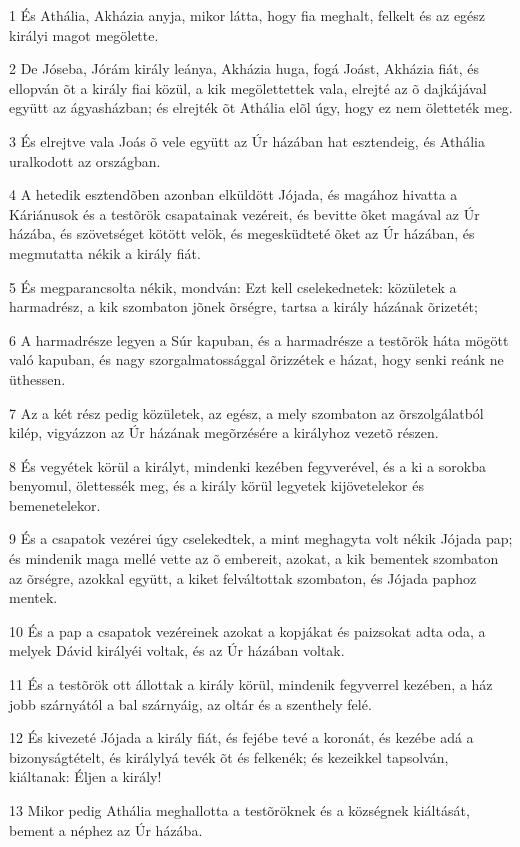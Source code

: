 \par 1 És Athália, Akházia anyja, mikor látta, hogy fia meghalt, felkelt  és az egész királyi magot megölette.
\par 2 De Jóseba, Jórám király leánya, Akházia huga, fogá Joást, Akházia fiát, és ellopván õt a király fiai közül, a kik megölettettek vala, elrejté az õ dajkájával együtt az ágyasházban; és elrejték õt Athália elõl úgy, hogy ez nem öletteték meg.
\par 3 És elrejtve vala Joás õ vele együtt az Úr házában hat esztendeig, és Athália uralkodott az országban.
\par 4 A hetedik esztendõben azonban elküldött Jójada, és magához hivatta a Káriánusok és a testõrök csapatainak vezéreit, és bevitte õket magával az Úr házába, és szövetséget kötött velök, és megesküdteté õket az Úr házában, és megmutatta nékik a király fiát.
\par 5 És megparancsolta nékik, mondván: Ezt kell cselekednetek: közületek a harmadrész, a kik szombaton jõnek õrségre, tartsa a király házának õrizetét;
\par 6 A harmadrésze legyen a Súr kapuban, és a harmadrésze a testõrök háta mögött való kapuban, és nagy szorgalmatossággal õrizzétek e házat, hogy senki reánk ne üthessen.
\par 7 Az a két rész pedig közületek, az egész, a mely szombaton az õrszolgálatból kilép, vigyázzon az Úr házának megõrzésére a királyhoz vezetõ részen.
\par 8 És vegyétek körül a királyt, mindenki kezében fegyverével, és a ki a sorokba benyomul, ölettessék meg, és a király körül legyetek kijövetelekor és bemenetelekor.
\par 9 És a csapatok vezérei úgy cselekedtek, a mint meghagyta volt nékik Jójada pap; és mindenik maga mellé vette az õ embereit, azokat, a kik bementek szombaton az õrségre, azokkal együtt, a kiket felváltottak szombaton, és Jójada paphoz mentek.
\par 10 És a pap a csapatok vezéreinek azokat a kopjákat és paizsokat adta oda, a melyek Dávid királyéi voltak, és az Úr házában voltak.
\par 11 És a testõrök ott állottak a király körül, mindenik fegyverrel kezében, a ház jobb szárnyától a bal szárnyáig, az oltár és a szenthely felé.
\par 12 És kivezeté Jójada a király fiát, és fejébe tevé a koronát, és kezébe adá a bizonyságtételt, és királylyá tevék õt és felkenék; és kezeikkel tapsolván, kiáltanak: Éljen a király!
\par 13 Mikor pedig Athália meghallotta a testõröknek és a községnek kiáltását, bement a néphez az Úr házába.
